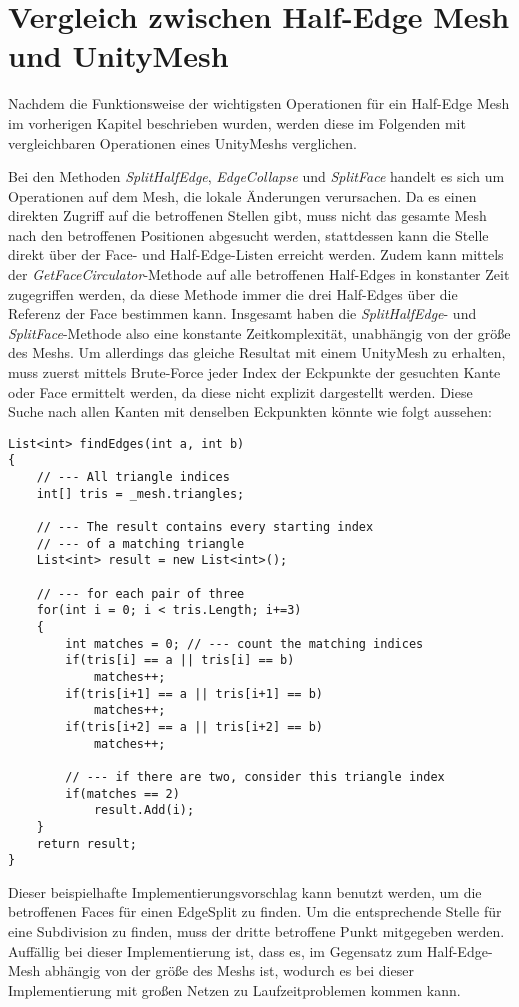 \section{Vergleich zwischen Half-Edge Mesh und UnityMesh}
Nachdem die Funktionsweise der wichtigsten Operationen f\"ur ein Half-Edge Mesh im vorherigen Kapitel beschrieben wurden, werden diese im Folgenden mit vergleichbaren Operationen eines UnityMeshs verglichen.

Bei den Methoden \textit{SplitHalfEdge}, \textit{EdgeCollapse} und \textit{SplitFace} handelt es sich um Operationen auf dem Mesh, die lokale \"Anderungen verursachen. Da es einen direkten Zugriff auf die betroffenen Stellen gibt, muss nicht das gesamte Mesh nach den betroffenen Positionen abgesucht werden, stattdessen kann die Stelle direkt \"uber der Face- und Half-Edge-Listen erreicht werden. Zudem kann mittels der \textit{GetFaceCirculator}-Methode auf alle betroffenen Half-Edges in konstanter Zeit zugegriffen werden, da diese Methode immer die drei Half-Edges \"uber die Referenz der Face bestimmen kann. Insgesamt haben die \textit{SplitHalfEdge}- und \textit{SplitFace}-Methode also eine konstante Zeitkomplexit\"at, unabh\"angig von der gr\"o{\ss}e des Meshs.
Um allerdings das gleiche Resultat mit einem UnityMesh zu erhalten, muss zuerst mittels Brute-Force jeder Index der Eckpunkte der gesuchten Kante oder Face ermittelt werden, da diese nicht explizit dargestellt werden. Diese Suche nach allen Kanten mit denselben Eckpunkten k\"onnte wie folgt aussehen:
\begin{lstlisting}
List<int> findEdges(int a, int b)
{
	// --- All triangle indices
	int[] tris = _mesh.triangles;
	
	// --- The result contains every starting index 
	// --- of a matching triangle
	List<int> result = new List<int>();
	
	// --- for each pair of three
	for(int i = 0; i < tris.Length; i+=3)
	{
		int matches = 0; // --- count the matching indices
		if(tris[i] == a || tris[i] == b)
			matches++;
		if(tris[i+1] == a || tris[i+1] == b)
			matches++;
		if(tris[i+2] == a || tris[i+2] == b)
			matches++;
			
		// --- if there are two, consider this triangle index
		if(matches == 2) 
			result.Add(i);
	}
	return result;
}
\end{lstlisting}
Dieser beispielhafte Implementierungsvorschlag kann benutzt werden, um die betroffenen Faces f\"ur einen EdgeSplit zu finden. Um die entsprechende Stelle f\"ur eine Subdivision zu finden, muss der dritte betroffene Punkt mitgegeben werden. Auff\"allig bei dieser Implementierung ist, dass es, im Gegensatz zum Half-Edge-Mesh abh\"angig von der gr\"o{\ss}e des Meshs ist, wodurch es bei dieser Implementierung mit gro{\ss}en Netzen zu Laufzeitproblemen kommen kann.

